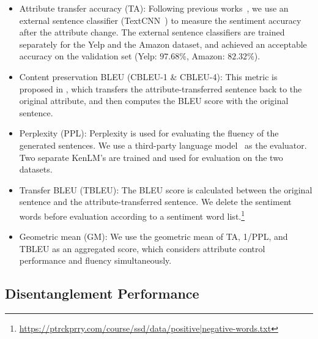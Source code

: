 \documentclass[11pt,a4paper]{article}
\renewcommand{\cite}{\citep}
\begin{document}
\begin{itemize}

   \item Attribute transfer accuracy (TA): Following previous works~\cite{john-etal-2019-disentangled,sha2021multi}, we use an external sentence classifier (TextCNN~\cite{kim-2014-convolutional}) to measure the sentiment accuracy after the attribute change. The external sentence classifiers are trained separately for the Yelp and the Amazon dataset, and achieved an acceptable accuracy on the validation set (Yelp: $97.68\%$, Amazon: $82.32\%$).
   
    \item Content preservation BLEU (CBLEU-1 \& CBLEU-4): This metric is proposed in \cite{logeswaran2018content}, which transfers the attribute-transferred sentence back to the original attribute, and then computes the BLEU score with the original sentence.
    \item Perplexity (PPL): Perplexity is used for evaluating the fluency of the generated sentences. We use a third-party language model~\cite[KenLM]{kneser1995improved} as the evaluator. Two separate KenLM's are trained and used for evaluation  on the two datasets.
    \item Transfer BLEU (TBLEU): The BLEU score is calculated between the original sentence and the attribute-transferred sentence. We delete the sentiment words before evaluation according to a sentiment word list.\footnote{\url{https://ptrckprry.com/course/ssd/data/positive|negative-words.txt}}
   \item Geometric mean (GM): We use the geometric mean of TA,  1/PPL, and TBLEU as an aggregated score, which considers attribute control performance and fluency simultaneously. 
\end{itemize}

\subsection{Disentanglement Performance}
  
\end{document}
